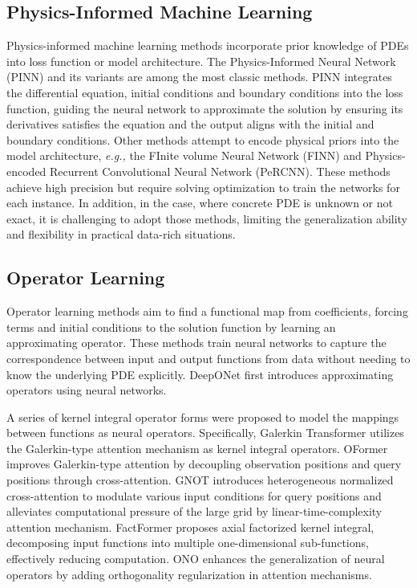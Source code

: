 \documentclass{article}
\begin{document}
\subsection{Physics-Informed Machine Learning}
Physics-informed machine learning methods incorporate prior knowledge of PDEs into loss function or model architecture. The Physics-Informed Neural Network (PINN)\cite{PINN} and its variants %
are among the most classic methods. PINN integrates the differential equation, initial conditions and boundary conditions into the loss function, guiding the neural network to approximate the solution by ensuring its derivatives satisfies the equation and the output aligns with the initial and boundary conditions. Other methods attempt to encode physical priors into the model architecture, {\em e.g.,} the FInite volume Neural Network (FINN)\cite{FINN} and Physics-encoded  Recurrent Convolutional Neural Network (PeRCNN)\cite{PeRCNN}. These methods achieve high precision but require solving optimization to train the networks for each instance. In addition, in the case, where concrete PDE is unknown or not exact, it is challenging to adopt those methods, limiting the generalization ability and flexibility in practical data-rich situations.

\subsection{Operator Learning}
Operator learning methods aim to find a functional map from coefficients, forcing terms and initial conditions to the solution function by learning an approximating operator. These methods train neural networks to capture the correspondence between input and output functions from data without needing to know the underlying PDE explicitly. DeepONet\cite{DeepONet,DeepONetTL} first introduces approximating operators using neural networks. 

A series of kernel integral operator forms were proposed to model the mappings between functions as neural operators\cite{GNO,FNO,NO}. 
%
Specifically, Galerkin Transformer\cite{GalerkinTransformer} utilizes the Galerkin-type attention mechanism as kernel integral operators.  OFormer\cite{OFormer} improves Galerkin-type attention by decoupling observation positions and query positions through cross-attention. GNOT\cite{GNOT} introduces heterogeneous normalized cross-attention to modulate various input conditions for query positions and alleviates computational pressure of the large grid by linear-time-complexity attention mechanism. FactFormer\cite{FactFormer} proposes axial factorized kernel integral, decomposing input functions into multiple one-dimensional sub-functions, effectively reducing computation. ONO\cite{ONO} enhances the generalization of neural operators by adding orthogonality regularization in attention mechanisms. 
\end{document}
